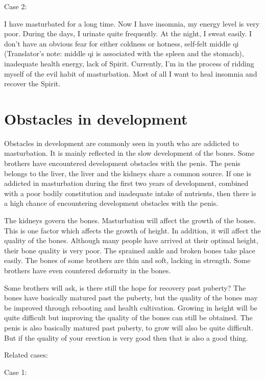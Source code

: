 \documentclass[
]{book}
\begin{document}
Case 2:

I have masturbated for a long time. Now I have insomnia, my energy level is very poor. During the days, I urinate quite frequently. At the night, I sweat easily. I don't have an obvious fear for either coldness or hotness, self-felt middle qi (Translator's note: middle qi is associated with the spleen and the stomach), inadequate health energy, lack of Spirit. Currently, I'm in the process of ridding myself of the evil habit of masturbation. Most of all I want to heal insomnia and recover the Spirit.

\hypertarget{obstacles-in-development-1}{%
\section{Obstacles in development}\label{obstacles-in-development-1}}

Obstacles in development are commonly seen in youth who are addicted to masturbation. It is mainly reflected in the slow development of the bones. Some brothers have encountered development obstacles with the penis. The penis belongs to the liver, the liver and the kidneys share a common source. If one is addicted in masturbation during the first two years of development, combined with a poor bodily constitution and inadequate intake of nutrients, then there is a high chance of encountering development obstacles with the penis.

The kidneys govern the bones. Masturbation will affect the growth of the bones. This is one factor which affects the growth of height. In addition, it will affect the quality of the bones. Although many people have arrived at their optimal height, their bone quality is very poor. The sprained ankle and broken bones take place easily. The bones of some brothers are thin and soft, lacking in strength. Some brothers have even countered deformity in the bones.

Some brothers will ask, is there still the hope for recovery past puberty? The bones have basically matured past the puberty, but the quality of the bones may be improved through rebooting and health cultivation. Growing in height will be quite difficult but improving the quality of the bones can still be obtained. The penis is also basically matured past puberty, to grow will also be quite difficult. But if the quality of your erection is very good then that is also a good thing.

Related cases:

Case 1:
\end{document}
